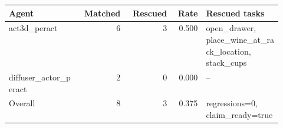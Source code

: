 \begin{tabular}{p{0.26\linewidth}rrrp{0.28\linewidth}}
\toprule
Agent & Matched & Rescued & Rate & Rescued tasks \\
\midrule
act3d\_peract & 6 & 3 & 0.500 & open\_drawer, place\_wine\_at\_rack\_location, stack\_cups \\
diffuser\_actor\_peract & 2 & 0 & 0.000 & -- \\
\midrule
Overall & 8 & 3 & 0.375 & regressions=0, claim\_ready=true \\
\bottomrule
\end{tabular}
